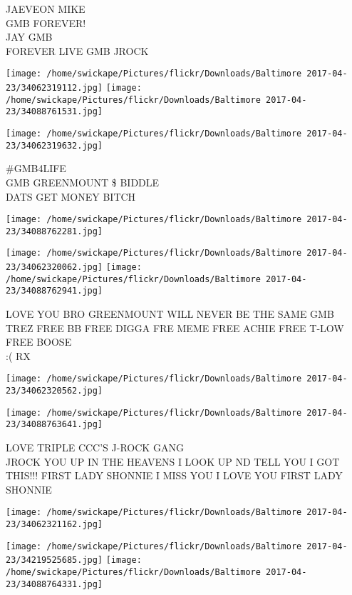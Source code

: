 \documentclass[10pt,letterpaper]{article}
\begin{document}
JAEVEON MIKE\\
GMB FOREVER!\\
JAY GMB\\
FOREVER LIVE GMB JROCK\\
\pagebreak

\texttt{[image: /home/swickape/Pictures/flickr/Downloads/Baltimore 2017-04-23/34062319112.jpg]}
\texttt{[image: /home/swickape/Pictures/flickr/Downloads/Baltimore 2017-04-23/34088761531.jpg]}

\vspace{0.25in}
\texttt{[image: /home/swickape/Pictures/flickr/Downloads/Baltimore 2017-04-23/34062319632.jpg]}

\#GMB4LIFE\\
GMB GREENMOUNT \$ BIDDLE\\
DATS GET MONEY BITCH\\
\pagebreak

\texttt{[image: /home/swickape/Pictures/flickr/Downloads/Baltimore 2017-04-23/34088762281.jpg]}

\vspace{0.25in}
\texttt{[image: /home/swickape/Pictures/flickr/Downloads/Baltimore 2017-04-23/34062320062.jpg]}
\texttt{[image: /home/swickape/Pictures/flickr/Downloads/Baltimore 2017-04-23/34088762941.jpg]}

LOVE YOU BRO GREENMOUNT WILL NEVER BE THE SAME GMB\\
TREZ FREE BB FREE DIGGA FRE MEME FREE ACHIE FREE T{-}LOW FREE BOOSE\\
:( RX\\
\pagebreak

\texttt{[image: /home/swickape/Pictures/flickr/Downloads/Baltimore 2017-04-23/34062320562.jpg]}

\vspace{0.25in}
\texttt{[image: /home/swickape/Pictures/flickr/Downloads/Baltimore 2017-04-23/34088763641.jpg]}

LOVE TRIPLE CCC'S J{-}ROCK GANG\\
JROCK YOU UP IN THE HEAVENS I LOOK UP ND TELL YOU I GOT THIS!!! FIRST LADY SHONNIE I MISS YOU I LOVE YOU FIRST LADY SHONNIE\\
\pagebreak

\texttt{[image: /home/swickape/Pictures/flickr/Downloads/Baltimore 2017-04-23/34062321162.jpg]}

\vspace{0.25in}
\texttt{[image: /home/swickape/Pictures/flickr/Downloads/Baltimore 2017-04-23/34219525685.jpg]}
\texttt{[image: /home/swickape/Pictures/flickr/Downloads/Baltimore 2017-04-23/34088764331.jpg]}
\end{document}
